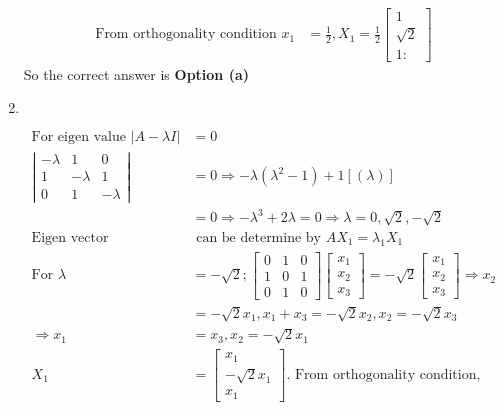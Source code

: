 \begin{enumerate}
\begin{answer}
\begin{align*}
	\text{From orthogonality condition }x_{1}&=\frac{1}{2}, X_{1}=\frac{1}{2}\left[\begin{array}{c}1 \\ \sqrt{2} \\ 1:\end{array}\right]
	\end{align*}
	So the correct answer is \textbf{Option (a)}
\end{answer}
\item $\left. \right. $
\begin{answer}
	\begin{align*}
	\text{For eigen value }|A-\lambda I|&=0\\
	\left|\begin{array}{ccc}-\lambda & 1 & 0 \\ 1 & -\lambda & 1 \\ 0 & 1 & -\lambda\end{array}\right|&=0 \Rightarrow-\lambda\left(\lambda^{2}-1\right)+1[(\lambda)]\\&=0 \Rightarrow-\lambda^{3}+2 \lambda=0 \Rightarrow \lambda=0, \sqrt{2},-\sqrt{2}\\
	\text{Eigen vector }&\text{ can be determine by }A X_{1}=\lambda_{1} X_{1}\\
	\text{For }\lambda&=-\sqrt{2} ;\left[\begin{array}{lll}0 & 1 & 0 \\ 1 & 0 & 1 \\ 0 & 1 & 0\end{array}\right]\left[\begin{array}{l}x_{1} \\ x_{2} \\ x_{3}\end{array}\right]=-\sqrt{2}\left[\begin{array}{c}x_{1} \\ x_{2} \\ x_{3}\end{array}\right] \Rightarrow x_{2}\\&=-\sqrt{2} x_{1}, x_{1}+x_{3}=-\sqrt{2} x_{2}, x_{2}=-\sqrt{2} x_{3}\\
	\Rightarrow x_{1}&=x_{3}, x_{2}=-\sqrt{2} x_{1}\\
	X_{1}&=\left[\begin{array}{c}x_{1} \\ -\sqrt{2} x_{1} \\ x_{1}\end{array}\right].\text{ From orthogonality condition, }\\

\end{align*}
\end{answer}
\end{enumerate}
